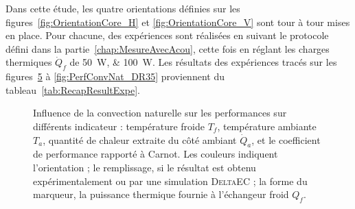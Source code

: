 Dans cette étude, les quatre orientations définies sur les figures~\ref{fig:OrientationCore_H} et \ref{fig:OrientationCore_V} sont tour à tour mises en place. Pour chacune, des expériences sont réalisées en suivant le protocole défini dans la partie~\ref{chap:MesureAvecAcou}, cette fois en réglant les charges thermiques $\dot Q_f$ de \qtylist{50;100}{\watt}. Les résultats des expériences tracés sur les figures~\ref{fig:PerfConvNat} à \ref{fig:PerfConvNat_DR35} proviennent du tableau~\ref{tab:RecapResultExpe}.\medskip


\begin{figure}[!ht]
    \centering
	\begin{subfigure}{.48\textwidth}
		\centering
        
		\caption{}
		\label{fig:PerfConvNat_Tf}
	\end{subfigure}%
	\begin{subfigure}{.48\textwidth}
		\centering
        
		\caption{}
		\label{fig:PerfConvNat_Ta}
	\end{subfigure}
	
	\vspace{1cm}
	
	\begin{subfigure}{.48\textwidth}
		\centering
        
		\caption{}
		\label{fig:PerfConvNat_Qa}
	\end{subfigure}%
	\begin{subfigure}{.48\textwidth}
		\centering
        
		\caption{}
		\label{fig:PerfConvNat_COP}
	\end{subfigure}	     
    \caption{Influence de la convection naturelle sur les performances sur différents indicateur :  température froide $T_f$,  température ambiante~$T_a$,  quantité de chaleur extraite du côté ambiant $\dot Q_a$, et  le coefficient de performance rapporté à Carnot. Les couleurs indiquent l'orientation ; le remplissage, si le résultat est obtenu expérimentalement ou par une simulation \textsc{DeltaEC} ; la forme du marqueur, la puissance thermique fournie à l'échangeur froid $Q_f$.}
    \label{fig:PerfConvNat}
\end{figure}

